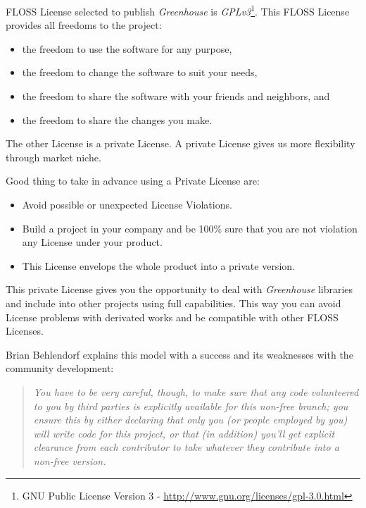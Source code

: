 \documentclass[11pt]{scrartcl}
\begin{document}
\par FLOSS License selected to publish \emph{Greenhouse} is \emph{GPLv3}\footnote{GNU Public License Version 3 - \url{http://www.gnu.org/licenses/gpl-3.0.html}}. This FLOSS License provides all freedoms to the project:

\begin{itemize}
	\item the freedom to use the software for any purpose,
	\item the freedom to change the software to suit your needs,
	\item the freedom to share the software with your friends and neighbors, and
	\item the freedom to share the changes you make.
\end{itemize}

\par The other License is a private License. A private License gives us more flexibility through market niche.

\par Good thing to take in advance using a Private License are:

\begin{itemize}
	\item Avoid possible or unexpected License Violations.
	\item Build a project in your company and be 100\% sure that you are not violation any License under your product.
	\item This License envelops the whole product into a private version.
\end{itemize}

\par This private License gives you the opportunity to deal with \emph{Greenhouse} libraries and include into other projects using full capabilities. This way you can avoid License problems with derivated works and be compatible with other FLOSS Licenses.

\par Brian Behlendorf\cite{brian-behlendorf-business-strategy} explains this model with a success and its weaknesses with the community development:

\begin{quotation}
    \emph{You have to be very careful, though, to make sure that any code volunteered to you by third parties is explicitly available for this non-free branch; you ensure this by either declaring that only you (or people employed by you) will write code for this project, or that (in addition) you'll get explicit clearance from each contributor to take whatever they contribute into a non-free version.}
\end{quotation}
\end{document}
